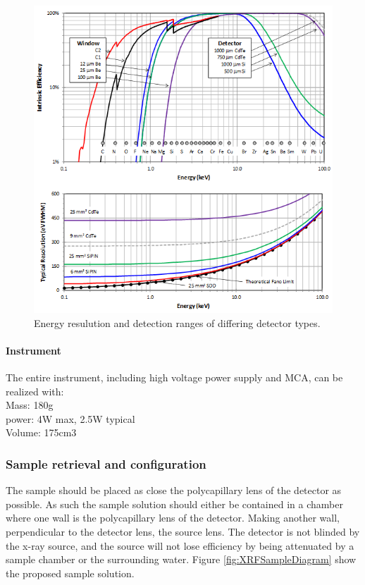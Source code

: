 \begin{figure}[h]
	\centering
	\includegraphics[width=\textwidth]{figures/XRF/EnergyRes.png}
	\caption{Energy resulution and detection ranges of differing detector types.\cite{AmptekDetector}}
	\label{fig:AmptekDetector}
\end{figure}

\paragraph{Instrument}
The entire instrument, including high voltage power supply and MCA, can be realized with\citep{AmptekDetector}:\\
Mass: 180g\\
power: 4W max, 2.5W typical\\
Volume: 175cm3



\subsubsection{Sample retrieval and configuration}
The sample should be placed as close the polycapillary lens of the detector as possible. As such the sample solution should either be contained in a chamber where one wall is the polycapillary lens of the detector. 
Making another wall, perpendicular to the detector lens, the source lens. The detector is not blinded by the x-ray source, and the source will not lose efficiency by being attenuated by a sample chamber or the surrounding water. Figure \ref{fig:XRFSampleDiagram} show the proposed sample solution.

